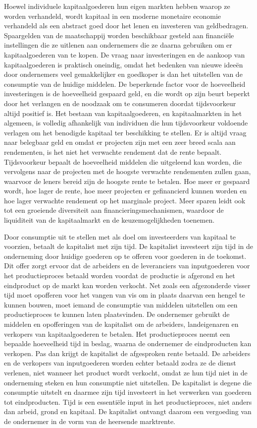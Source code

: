 \documentclass[
  a5paper,
  smalldemyvopaper,11pt,twoside,onecolumn,openright,extrafontsizes,
hidelinks]{memoir}
\begin{document}
Hoewel individuele kapitaalgoederen hun eigen markten hebben waarop ze
worden verhandeld, wordt kapitaal in een moderne monetaire economie
verhandeld als een abstract goed door het lenen en investeren van
geldbedragen. Spaargelden van de maatschappij worden beschikbaar gesteld
aan financiële instellingen die ze uitlenen aan ondernemers die ze
daarna gebruiken om er kapitaalgoederen van te kopen. De vraag naar
investeringen en de aankoop van kapitaalgoederen is praktisch oneindig,
omdat het bedenken van nieuwe ideeën door ondernemers veel gemakkelijker
en goedkoper is dan het uitstellen van de consumptie van de huidige
middelen. De beperkende factor voor de hoeveelheid investeringen is de
hoeveelheid gespaard geld, en die wordt op zijn beurt beperkt door het
verlangen en de noodzaak om te consumeren doordat tijdsvoorkeur altijd
positief is. Het bestaan van kapitaalgoederen, en kapitaalmarkten in het
algemeen, is volledig afhankelijk van individuen die hun tijdsvoorkeur
voldoende verlagen om het benodigde kapitaal ter beschikking te stellen.
Er is altijd vraag naar belegbaar geld en omdat er projecten zijn met
een zeer breed scala aan rendementen, is het niet het verwachte
rendement dat de rente bepaalt. Tijdsvoorkeur bepaalt de hoeveelheid
middelen die uitgeleend kan worden, die vervolgens naar de projecten met
de hoogste verwachte rendementen zullen gaan, waarvoor de leners bereid
zijn de hoogste rente te betalen. Hoe meer er gespaard wordt, hoe lager
de rente, hoe meer projecten er gefinancierd kunnen worden en hoe lager
verwachte rendement op het marginale project. Meer sparen leidt ook tot
een groeiende diversiteit aan financieringsmechanismen, waardoor de
liquiditeit van de kapitaalmarkt en de keuzemogelijkheden toenemen.

Door consumptie uit te stellen met als doel om investeerders van
kapitaal te voorzien, betaalt de kapitalist met zijn tijd. De kapitalist
investeert zijn tijd in de onderneming door huidige goederen op te
offeren voor goederen in de toekomst. Dit offer zorgt ervoor dat de
arbeiders en de leveranciers van inputgoederen voor het productieproces
betaald worden voordat de productie is afgerond en het eindproduct op de
markt kan worden verkocht. Net zoals een afgezonderde visser tijd moet
opofferen voor het vangen van vis om in plaats daarvan een hengel te
kunnen bouwen, moet iemand de consumptie van middelen uitstellen om een
productieproces te kunnen laten plaatsvinden. De ondernemer gebruikt de
middelen en opofferingen van de kapitalist om de arbeiders,
landeigenaren en verkopers van kapitaalgoederen te betalen. Het
productieproces neemt een bepaalde hoeveelheid tijd in beslag, waarna de
ondernemer de eindproducten kan verkopen. Pas dan krijgt de kapitalist
de afgesproken rente betaald. De arbeiders en de verkopers van
inputgoederen worden echter betaald zodra ze de dienst verlenen, niet
wanneer het product wordt verkocht, omdat ze hun tijd niet in de
onderneming steken en hun consumptie niet uitstellen. De kapitalist is
degene die consumptie uitstelt en daarmee zijn tijd investeert in het
verwerken van goederen tot eindproducten. Tijd is een essentiële input
in het productieproces, niet anders dan arbeid, grond en kapitaal. De
kapitalist ontvangt daarom een vergoeding van de ondernemer in de vorm
van de heersende marktrente.
\end{document}
